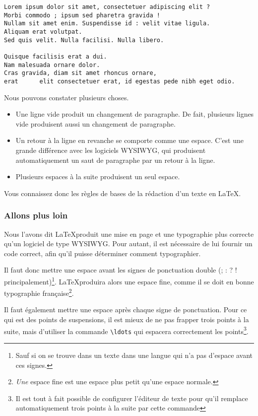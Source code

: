 \begin{verbatim}
Lorem ipsum dolor sit amet, consectetuer adipiscing elit ?
Morbi commodo ; ipsum sed pharetra gravida !
Nullam sit amet enim. Suspendisse id : velit vitae ligula.
Aliquam erat volutpat.
Sed quis velit. Nulla facilisi. Nulla libero. 

Quisque facilisis erat a dui.
Nam malesuada ornare dolor.
Cras gravida, diam sit amet rhoncus ornare, 
erat      elit consectetuer erat, id egestas pede nibh eget odio.
\end{verbatim}


Nous pouvons constater plusieurs choses.
\begin{itemize}
\item Une ligne vide produit un changement de paragraphe. De fait, plusieurs lignes vide produisent aussi un changement de paragraphe.
\item Un retour à la ligne en revanche se comporte comme une espace. C'est une grande différence avec les logiciels WYSIWYG, qui produisent automatiquement un saut de paragraphe par un retour à la ligne.
\item Plusieurs espaces à la suite produisent un seul espace. 
\end{itemize}

Vous connaissez donc les règles de bases de la rédaction d'un texte en \LaTeX.

\subsubsection{Allons plus loin}


Nous l'avons dit \LaTeX produit une mise en page et une typographie plus correcte qu'un logiciel de type WYSIWYG. Pour autant, il est nécessaire de lui fournir un code correct, afin qu'il puisse déterminer comment typographier.

Il faut donc mettre une espace avant les signes de ponctuation double (; : ? ! principalement)\footnote{Sauf si on se trouve dans un texte dans une langue qui n'a pas d'espace avant ces signes.}. \LaTeX produira alors une espace fine, comme il se doit en bonne typographie fran\c caise\footnote{\emph{Une} espace fine est une espace plus petit qu'une espace normale.}.

Il faut également mettre une espace après chaque signe de ponctuation. Pour ce qui est des points de suspensions, il est mieux de ne pas frapper trois points à la suite, mais d'utiliser la commande \verb|\ldots| qui espacera correctement les points\footnote{Il est tout à fait possible de configurer l'éditeur de texte pour qu'il remplace automatiquement trois points à la suite par cette commande}.

